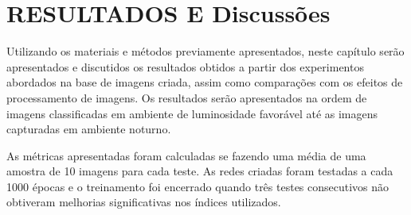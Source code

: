 \chapter{RESULTADOS E Discussões}\label{ch:intro}
Utilizando os materiais e métodos previamente apresentados, neste capítulo serão
apresentados e discutidos os resultados obtidos a partir dos experimentos abordados na base de imagens criada, assim como comparações com os efeitos de processamento de imagens. Os resultados serão apresentados na ordem de imagens classificadas em ambiente de luminosidade favorável até as imagens capturadas em ambiente noturno.


As métricas apresentadas foram calculadas se fazendo uma média de uma amostra de
10 imagens para cada teste. As redes criadas foram testadas a cada 1000 épocas e
o treinamento foi encerrado quando três testes consecutivos não obtiveram melhorias
significativas nos índices utilizados.